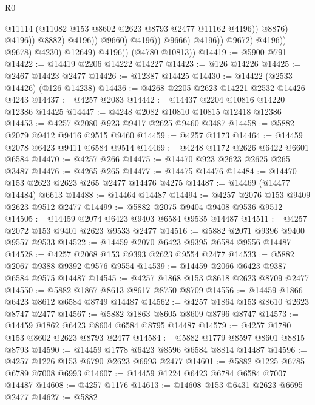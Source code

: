 \begin{lexlean}{R0}
\begin{coremodule}
                                                @11114
                                                (@11082 @153 @8602 @2623 @8793 @2477 @11162 @4196))
                                              @8876)
                                            @4196))
                                        @8882)
                                      @4196))
                                  @9660)
                                @4196))
                            @9666)
                          @4196))
                      @9672)
                    @4196))
                @9678)
              @4230)
            @12649)
          @4196))
      (@4780 @10813))
@14419 := @5900 @791
@14422 := @14419 @2206 @14222 @14227
@14423 := @126 @14226
@14425 := @2467 @14423 @2477
@14426 := @12387 @14425
@14430 := @14422 (@2533 @14426) (@126 @14238)
@14436 := @4268 @2205 @2623 @14221 @2532 @14426 @4243
@14437 := @4257 @2083
@14442 := @14437 @2204 @10816 @14220 @12386 @14425
@14447 := @4248 @2082 @10810 @10815 @12418 @12386
@14453 := @4257 @2080 @923 @9417 @2625 @9460 @3487
@14458 := @5882 @2079 @9412 @9416 @9515 @9460
@14459 := @4257 @1173
@14464 := @14459 @2078 @6423 @9411 @6584 @9514
@14469 := @4248 @1172 @2626 @6422 @6601 @6584
@14470 := @4257 @266
@14475 := @14470 @923 @2623 @2625 @265 @3487
@14476 := @4265 @265
@14477 := @14475 @14476
@14484 := @14470 @153 @2623 @2623 @265 @2477 @14476 @4275
@14487 := @14469 (@14477 @14484) @6613
@14488 := @14464 @14487
@14494 := @4257 @2076 @153 @9409 @2623 @9512 @2477
@14499 := @5882 @2075 @9404 @9408 @9536 @9512
@14505 := @14459 @2074 @6423 @9403 @6584 @9535 @14487
@14511 := @4257 @2072 @153 @9401 @2623 @9533 @2477
@14516 := @5882 @2071 @9396 @9400 @9557 @9533
@14522 := @14459 @2070 @6423 @9395 @6584 @9556 @14487
@14528 := @4257 @2068 @153 @9393 @2623 @9554 @2477
@14533 := @5882 @2067 @9388 @9392 @9576 @9554
@14539 := @14459 @2066 @6423 @9387 @6584 @9575 @14487
@14545 := @4257 @1868 @153 @8618 @2623 @8709 @2477
@14550 := @5882 @1867 @8613 @8617 @8750 @8709
@14556 := @14459 @1866 @6423 @8612 @6584 @8749 @14487
@14562 := @4257 @1864 @153 @8610 @2623 @8747 @2477
@14567 := @5882 @1863 @8605 @8609 @8796 @8747
@14573 := @14459 @1862 @6423 @8604 @6584 @8795 @14487
@14579 := @4257 @1780 @153 @8602 @2623 @8793 @2477
@14584 := @5882 @1779 @8597 @8601 @8815 @8793
@14590 := @14459 @1778 @6423 @8596 @6584 @8814 @14487
@14596 := @4257 @1226 @153 @6790 @2623 @6993 @2477
@14601 := @5882 @1225 @6785 @6789 @7008 @6993
@14607 := @14459 @1224 @6423 @6784 @6584 @7007 @14487
@14608 := @4257 @1176
@14613 := @14608 @153 @6431 @2623 @6695 @2477
@14627 := @5882

\end{coremodule}
\end{lexlean}
